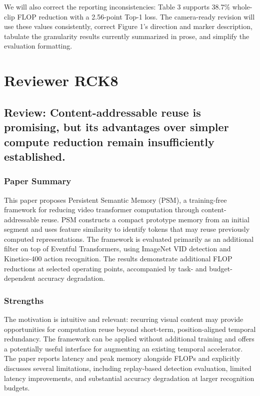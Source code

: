 \documentclass[11pt]{article}
\begin{document}
We will also correct the reporting inconsistencies: Table 3 supports 38.7\% whole-clip FLOP reduction with a 2.56-point Top-1 loss. The camera-ready revision will use these values consistently, correct Figure 1's direction and marker description, tabulate the granularity results currently summarized in prose, and simplify the evaluation formatting.

\clearpage

\section{Reviewer RCK8}

\subsection*{Review: Content-addressable reuse is promising, but its advantages over simpler compute reduction remain insufficiently established.}

\subsubsection*{Paper Summary}
This paper proposes Persistent Semantic Memory (PSM), a training-free framework for reducing video transformer computation through content-addressable reuse. PSM constructs a compact prototype memory from an initial segment and uses feature similarity to identify tokens that may reuse previously computed representations. The framework is evaluated primarily as an additional filter on top of Eventful Transformers, using ImageNet VID detection and Kinetics-400 action recognition. The results demonstrate additional FLOP reductions at selected operating points, accompanied by task- and budget-dependent accuracy degradation.

\subsubsection*{Strengths}
The motivation is intuitive and relevant: recurring visual content may provide opportunities for computation reuse beyond short-term, position-aligned temporal redundancy.
The framework can be applied without additional training and offers a potentially useful interface for augmenting an existing temporal accelerator.
The paper reports latency and peak memory alongside FLOPs and explicitly discusses several limitations, including replay-based detection evaluation, limited latency improvements, and substantial accuracy degradation at larger recognition budgets.
\end{document}
